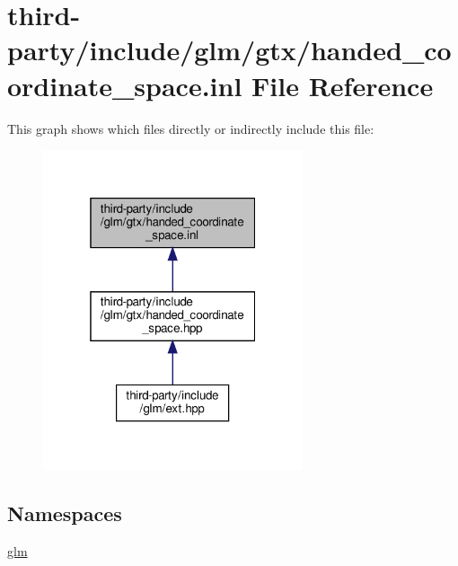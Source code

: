 \hypertarget{handed__coordinate__space_8inl}{}\section{third-\/party/include/glm/gtx/handed\+\_\+coordinate\+\_\+space.inl File Reference}
\label{handed__coordinate__space_8inl}
This graph shows which files directly or indirectly include this file\+:
\nopagebreak
\begin{figure}[H]
\begin{center}
\leavevmode
\includegraphics[width=217pt]{handed__coordinate__space_8inl__dep__incl}
\end{center}
\end{figure}
\subsection*{Namespaces}
\begin{DoxyCompactItemize}
\item 
 \hyperlink{namespaceglm}{glm}
\end{DoxyCompactItemize}
